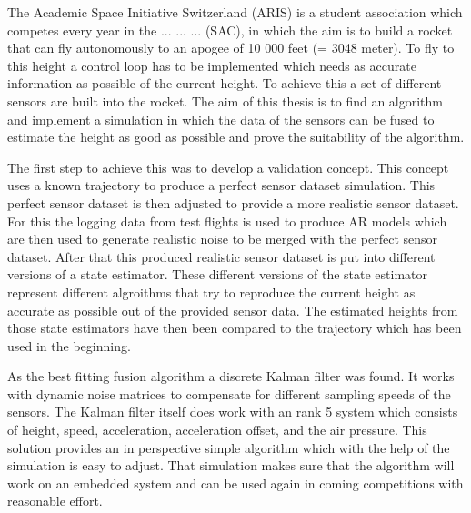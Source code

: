 The Academic Space Initiative Switzerland (ARIS) is a student association which competes every year in the ... ... ... (SAC),
in which the aim is to build a rocket that can fly autonomously to an apogee of 10 000 feet (= 3048 meter).
To fly to this height a control loop has to be implemented which needs as accurate information as possible of the current height.
To achieve this a set of different sensors are built into the rocket.
The aim of this thesis is to find an algorithm and implement a simulation in which the data of the sensors can be fused to estimate the height as good as possible and prove the suitability of the algorithm.


The first step to achieve this was to develop a validation concept.
This concept uses a known trajectory to produce a perfect sensor dataset simulation.
This perfect sensor dataset is then adjusted to provide a more realistic sensor dataset.
For this the logging data from test flights is used to produce AR models which are then used to generate realistic noise to be merged with the perfect sensor dataset.
After that this produced realistic sensor dataset is put into different versions of a state estimator.
These different versions of the state estimator represent different algroithms that try to reproduce the current height as accurate as possible out of the provided sensor data.
The estimated heights from those state estimators have then been compared to the trajectory which has been used in the beginning.


As the best fitting fusion algorithm a discrete Kalman filter was found.
It works with dynamic noise matrices to compensate for different sampling speeds of the sensors.
The Kalman filter itself does work with an rank 5 system which consists of height, speed, acceleration, acceleration offset, and the air pressure.
This solution provides an in perspective simple algorithm which with the help of the simulation is easy to adjust.
That simulation makes sure that the algorithm will work on an embedded system and can be used again in coming competitions with reasonable effort.
